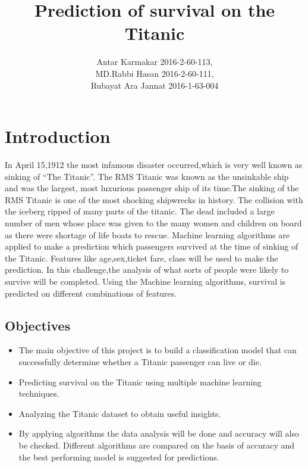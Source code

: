\documentclass[11pt]{article} %
\title{Prediction of survival on the Titanic}
\author{Antar Karmakar 2016-2-60-113,\\ MD.Rabbi Hasan 2016-2-60-111,\\ Rubayat Ara Jannat 2016-1-63-004}
\begin{document}
\maketitle

\section{Introduction} %

In April 15,1912 the most infamous disaster occurred,which is very well known as sinking of “The Titanic”. The RMS Titanic was known as the unsinkable ship and was the largest, most luxurious passenger ship of its time.The sinking of the RMS Titanic is one of the most shocking shipwrecks in history. The collision with the iceberg ripped of many parts of the titanic. The dead included a large number of men whose place was given to the many women and children on board as there were shortage of life boats to rescue.
Machine learning algorithms are applied to make a prediction which passengers survived at the time of sinking of the Titanic. Features like age,sex,ticket fare, class will be used to make the prediction. In this challenge,the analysis of what sorts of people were likely to survive will be completed. Using the Machine learning algorithms, survival is predicted on different combinations of features.
 
\subsection{Objectives}
\begin{itemize}
\item The main objective of this project is to build a classification model that can successfully determine whether a Titanic passenger can live or die.
\item Predicting survival on the Titanic using multiple machine learning techniques.
\item Analyzing the Titanic dataset to obtain useful insights.
\item By applying algorithms the data analysis will be done and accuracy will also be checked. Different algorithms are compared on the basis of accuracy and the best performing model is suggested for predictions.
\end{itemize}
\end{document}
